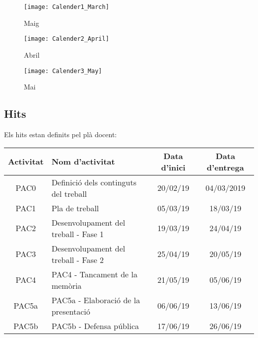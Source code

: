 \documentclass[]{article}
\begin{document}
\begin{figure}[H]
\caption{Maig}
\centering
\texttt{[image: Calender1\_March]}
\end{figure}


\begin{figure}[H]
\caption{Abril}
\centering
\texttt{[image: Calender2\_April]}
\end{figure}

\begin{figure}[H]
\caption{Mai}
\centering
\texttt{[image: Calender3\_May]}
\end{figure}

\subsection{Hits}
Els hits estan definits pel plà docent:

\begin{center}
 \begin{tabular}{||c | l | c | c||} 
 \hline
 Activitat & Nom d'activitat & Data d'inici & Data d'entrega  \\ [0.5ex] 
 \hline\hline
 PAC0 & Definició dels continguts del treball & 20/02/19 & \cellcolor[HTML]{AA0044} 04/03/2019 \\ 
 \hline
 PAC1 & Pla de treball & 05/03/19 & \cellcolor[HTML]{AA0044}18/03/19 \\
 \hline
 PAC2 & Desenvolupament del treball - Fase 1 & 19/03/19 &\cellcolor[HTML]{AA0044} 24/04/19 \\
 \hline
 PAC3 & Desenvolupament del treball - Fase 2 &  25/04/19 &\cellcolor[HTML]{AA0044} 20/05/19 \\
 \hline
 PAC4 & PAC4 - Tancament de la memòria & 21/05/19 &\cellcolor[HTML]{AA0044} 05/06/19 \\
 \hline
 PAC5a & PAC5a - Elaboració de la presentació & 06/06/19 &\cellcolor[HTML]{AA0044} 13/06/19 \\ 
  \hline
 PAC5b & PAC5b - Defensa pública & 17/06/19 &\cellcolor[HTML]{AA0044} 26/06/19 \\[1ex] 
 \hline
\end{tabular}
\end{center}
\end{document}
